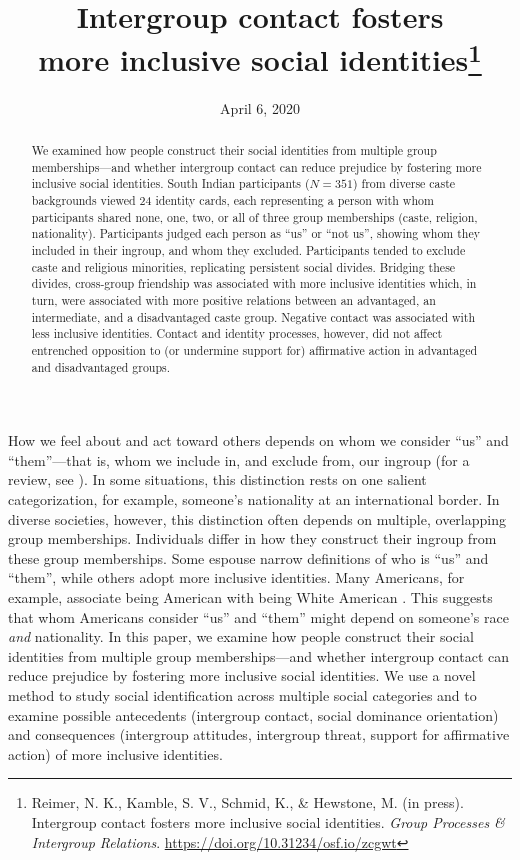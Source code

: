 \documentclass[12pt, a4paper]{article}
\title{Intergroup contact fosters\\more inclusive social identities\thanks{Reimer, N. K., Kamble, S. V., Schmid, K., \& Hewstone, M. (in press). Intergroup contact fosters more inclusive social identities. \textit{Group Processes \& Intergroup Relations}. \href{https://doi.org/10.31234/osf.io/zcgwt}{https://doi.org/10.31234/osf.io/zcgwt}}}
\date{April 6, 2020}
\begin{document}
\maketitle

\begin{abstract}
\noindent We examined how people construct their social identities from multiple group memberships---and whether intergroup contact can reduce prejudice by fostering more inclusive social identities. South Indian participants ($N = 351$) from diverse caste backgrounds viewed 24 identity cards, each representing a person with whom participants shared none, one, two, or all of three group memberships (caste, religion, nationality). Participants judged each person as “us” or “not us”, showing whom they included in their ingroup, and whom they excluded. Participants tended to exclude caste and religious minorities, replicating persistent social divides. Bridging these divides, cross-group friendship was associated with more inclusive identities which, in turn, were associated with more positive relations between an advantaged, an intermediate, and a disadvantaged caste group. Negative contact was associated with less inclusive identities. Contact and identity processes, however, did not affect entrenched opposition to (or undermine support for) affirmative action in advantaged and disadvantaged groups.\\[1ex]
\end{abstract}

\noindent How we feel about and act toward others depends on whom we consider “us” and “them”---that is, whom we include in, and exclude from, our ingroup (for a review, see ).  In some situations, this distinction rests on one salient categorization, for example, someone's nationality at an international border. In diverse societies, however, this distinction often depends on multiple, overlapping group memberships. Individuals differ in how they construct their ingroup from these group memberships. Some espouse narrow definitions of who is “us” and “them”, while others adopt more inclusive identities. Many Americans, for example, associate being American with being White American \parencite{devos_american_2005}. This suggests that whom Americans consider “us” and “them” might depend on someone's race \emph{and} nationality. In this paper, we examine how people construct their social identities from multiple group memberships---and whether intergroup contact can reduce prejudice by fostering more inclusive social identities. We use a novel method to study social identification across multiple social categories and to examine possible antecedents (intergroup contact, social dominance orientation) and consequences (intergroup attitudes, intergroup threat, support for affirmative action) of more inclusive identities.
\end{document}

